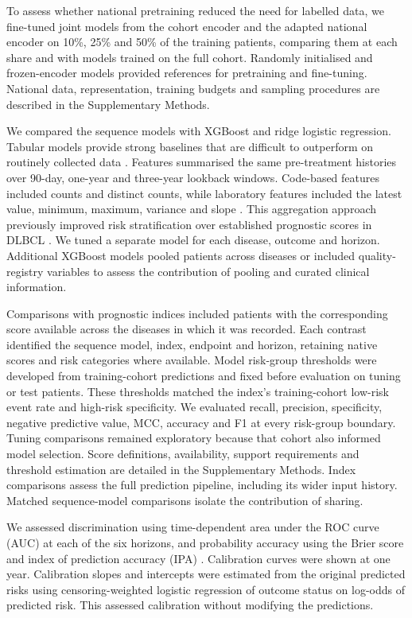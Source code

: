 To assess whether national pretraining reduced the need for labelled data, we
fine-tuned joint models from the cohort encoder and the adapted national
encoder on 10\%, 25\% and 50\% of the training patients, comparing them at each
share and with models trained on the full cohort. Randomly initialised and
frozen-encoder models provided references for pretraining and fine-tuning.
National data, representation, training budgets and sampling procedures are
described in the Supplementary Methods.

We compared the sequence models with XGBoost \citep{chen2016xgboost} and
ridge logistic regression. Tabular models provide strong baselines that are
difficult to outperform on routinely collected data
\citep{grinsztajn2022tabular}. Features summarised the same pre-treatment
histories over 90-day, one-year and three-year lookback windows. Code-based
features included counts and distinct counts, while laboratory features included
the latest value, minimum, maximum, variance and slope
\citep{bernstorff2023tsflattener}. This aggregation approach previously improved
risk stratification over established prognostic scores in DLBCL
\citep{werling2026dlbcl}. We tuned a separate model for each disease, outcome
and horizon. Additional XGBoost models pooled patients across diseases or
included quality-registry variables to assess the contribution of pooling and
curated clinical information.

Comparisons with prognostic indices included patients with the corresponding
score available across the diseases in which it was recorded. Each contrast identified the sequence model, index,
endpoint and horizon, retaining native scores and risk categories where
available. Model risk-group thresholds were developed from training-cohort predictions
and fixed before evaluation on tuning or test patients. These thresholds
matched the index's training-cohort low-risk event rate and high-risk
specificity. We evaluated recall, precision, specificity, negative predictive
value, MCC, accuracy and F1 at every risk-group boundary. Tuning comparisons
remained exploratory because that cohort also informed model selection. Score definitions, availability, support requirements and threshold
estimation are detailed in the Supplementary Methods. Index comparisons
assess the full prediction pipeline, including its wider input history.
Matched sequence-model comparisons isolate the contribution of sharing.

We assessed discrimination using time-dependent area under the ROC curve (AUC)
at each of the six horizons, and probability accuracy using the Brier score
and index of prediction accuracy (IPA)
\citep{blanche2013competingauc,gerds2006brier,schoop2011competing,kattan2018ipa}.
Calibration curves were shown at one year. Calibration slopes and intercepts
were estimated from the original predicted risks using censoring-weighted
logistic regression of outcome status on log-odds of predicted risk.
This assessed calibration without modifying the predictions.

